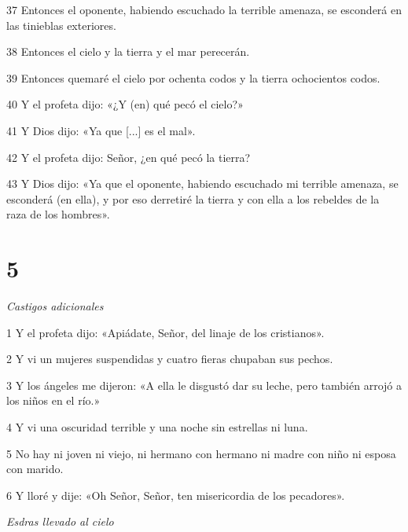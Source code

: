 \par 37 Entonces el oponente, habiendo escuchado la terrible amenaza, se esconderá en las tinieblas exteriores.

\par 38 Entonces el cielo y la tierra y el mar perecerán.

\par 39 Entonces quemaré el cielo por ochenta codos y la tierra ochocientos codos.

\par 40 Y el profeta dijo: «¿Y (en) qué pecó el cielo?»

\par 41 Y Dios dijo: «Ya que [...] es el mal». 

\par 42 Y el profeta dijo: Señor, ¿en qué pecó la tierra?

\par 43 Y Dios dijo: «Ya que el oponente, habiendo escuchado mi terrible amenaza, se esconderá (en ella), y por eso derretiré la tierra y con ella a los rebeldes de la raza de los hombres».

\chapter{5}

\par \textit{Castigos adicionales}

\par 1 Y el profeta dijo: «Apiádate, Señor, del linaje de los cristianos». 

\par 2 Y vi un mujeres suspendidas y cuatro fieras chupaban sus pechos.

\par 3 Y los ángeles me dijeron: «A ella le disgustó dar su leche, pero también arrojó a los niños en el río.»

\par 4 Y vi una oscuridad terrible y una noche sin estrellas ni luna. 

\par 5 No hay ni joven ni viejo, ni hermano con hermano ni madre con niño ni esposa con marido.

\par 6 Y lloré y dije: «Oh Señor, Señor, ten misericordia de los pecadores».

\par \textit{Esdras llevado al cielo}

